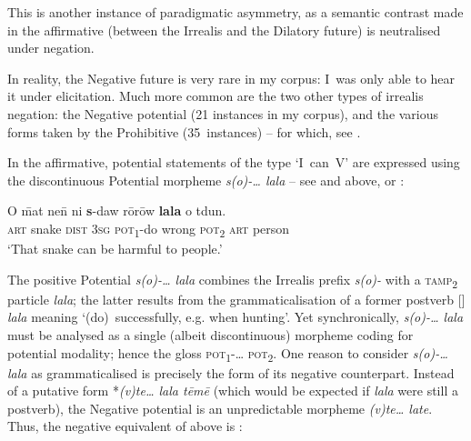 \documentclass[output=paper,colorlinks,citecolor=brown,draft]{langscibook}
\begin{document}
\noindent This is another instance of paradigmatic asymmetry, as a semantic contrast made in the affirmative (between the Irrealis and the Dilatory future) is neutralised under negation.

In reality, the Negative future is very rare in my corpus: I~was only able to hear it under elicitation. Much more common are the two other types of irrealis negation: the Negative potential (21 instances in my corpus), and the various forms taken by the Prohibitive (35~instances) – for which, see .

In the affirmative, potential statements of the type ‘I~can~V’ are expressed using the discontinuous Potential morpheme \textit{s(o)-… lala} – see  and  above, or :

\ea\label{ex:dor:potential} 
    \gll  O \={m}at ne\={n} ni \textbf{s}-daw rōrōw \textbf{lala} o tdun.\\ 
          \textsc{art} snake \textsc{dist} \textsc{3sg} \textsc{pot\textsubscript{1}}-do wrong \textsc{pot\textsubscript{2}} \textsc{art} person\\
    \glt ‘That snake can be harmful to people.’  
\z 

The positive Potential \textit{s(o)-… lala} combines the Irrealis prefix \textit{s(o)-} with a \textsc{tamp}\textsubscript{2} particle \textit{lala}; the latter results from the grammaticalisation of a former postverb [] \textit{lala} meaning ‘(do)~successfully, e.g. when hunting’. Yet synchronically, \textit{s(o)-… lala} must be analysed as a single (albeit discontinuous) morpheme coding for potential modality; hence the gloss \textsc{pot\textsubscript{1}}-… \textsc{pot\textsubscript{2}}. One reason to consider \textit{s(o)-… lala} as grammaticalised is precisely the form of its negative counterpart. Instead of a putative form *\textit{(v)te… lala tēmē} (which would be expected if \textit{lala} were still a postverb), the Negative potential is an unpredictable morpheme \textit{(v)te… late}. Thus, the negative equivalent of  above is :

\end{document}
